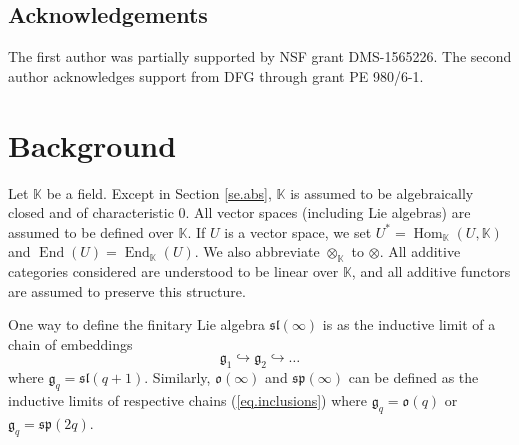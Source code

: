 \documentclass[11pt]{article}
\theoremstyle{plain}
\theoremstyle{nonumberplain}
\theoremstyle{plain}
\theoremstyle{nonumberplain}
\newcommand\bK{\mathbb K}
\newcommand\fg{\mathfrak{g}}
\newcommand\fsl{\mathfrak{sl}}
\newcommand\fo{\mathfrak{o}}
\newcommand\fsp{\mathfrak{sp}}
\DeclareMathOperator{\End}{\mathrm{End}}
\DeclareMathOperator{\Hom}{\mathrm{Hom}}
\begin{document}
\subsection*{Acknowledgements}

The first author was partially supported by NSF grant DMS-1565226.
The second author acknowledges support from DFG through grant PE
980/6-1.



\section{Background}\label{se.prel}


Let $\bK$ be a field.  Except in Section \ref{se.abs}, $\bK$
is assumed to be algebraically closed and of characteristic $0$.  All
vector spaces (including Lie algebras) are assumed to be defined over
$\bK$.  If $U$ is a vector space, we set $U^*=\Hom_\bK(U,\bK)$ and $\End(U)=\End_\bK(U)$.  We also abbreviate $\otimes_\bK$ to $\otimes$.  All additive categories considered are understood to be linear over $\bK$, and all additive functors are assumed to preserve
this structure.   

One way to define the
finitary Lie algebra $\fsl(\infty)$ is as the inductive limit
of a chain of embeddings
	\begin{equation}
		\fg_1\hookrightarrow\fg_2\hookrightarrow\ldots
		\label{eq.inclusions}
	\end{equation}
	where $\fg_q=\fsl(q+1)$.  Similarly, $\fo(\infty)$ and
        $\fsp(\infty)$ can be defined as the inductive limits of
        respective chains (\ref{eq.inclusions}) where $\fg_q=\fo(q)$ or
        $\fg_q=\fsp(2q)$.
\end{document}
